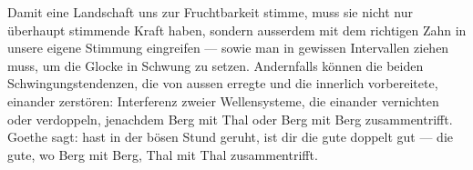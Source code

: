 Damit eine Landschaft uns zur Fruchtbarkeit stimme, muss sie nicht nur überhaupt stimmende Kraft haben, sondern ausserdem mit dem richtigen Zahn in unsere eigene Stimmung eingreifen — sowie man in gewissen Intervallen ziehen muss, um die Glocke in Schwung zu setzen. Andernfalls können die beiden Schwingungstendenzen, die von aussen erregte und die innerlich vorbereitete, einander zerstören: Interferenz zweier Wellensysteme, die einander vernichten oder verdoppeln, jenachdem Berg mit Thal oder Berg mit Berg zusammentrifft. Goethe sagt: hast in der bösen Stund geruht, ist dir die gute doppelt gut — die gute, wo Berg mit Berg, Thal mit Thal zusammentrifft.
\par

